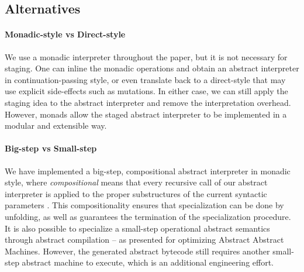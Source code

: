 \subsection{Alternatives}

\paragraph{Monadic-style vs Direct-style} We use a monadic interpreter
throughout the paper, but it is not necessary for staging. One can inline the
monadic operations and obtain an abstract interpreter in continuation-passing
style, or even translate back to a direct-style that may use explicit
side-effects such as mutations. In either case, we can still apply the staging
idea to the abstract interpreter and remove the interpretation overhead.
However, monads allow the staged abstract interpreter to be implemented in a
modular and extensible way.

\paragraph{Big-step vs Small-step}

We have implemented a big-step, compositional abstract interpreter in monadic
style, where \textit{compositional} means that every recursive call of our abstract
interpreter is applied to the proper substructures of the current syntactic
parameters \cite{10.1007/3-540-61580-6_11}. This compositionality ensures that
specialization can be done by unfolding, as well as guarantees the termination
of the specialization procedure. It is also possible to specialize a small-step
operational abstract semantics through abstract compilation
\cite{Boucher:1996:ACN:647473.727587} -- as
\citet{Johnson:2013:OAA:2500365.2500604} presented for
optimizing Abstract Abstract Machines. However, the generated abstract
bytecode still requires another small-step abstract machine to execute, which is
an additional engineering effort.
